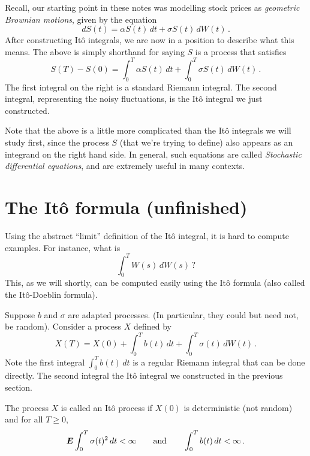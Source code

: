 Recall, our starting point in these notes was modelling stock prices as \emph{geometric Brownian motions}, given by the equation
\begin{equation*}
  dS(t) = \alpha S(t) \, dt + \sigma S(t) \, dW(t)\,.
\end{equation*}
After constructing It\^o integrals, we are now in a position to describe what this means.
The above is simply shorthand for saying $S$ is a process that satisfies
\begin{equation*}
  S(T) - S(0) = \int_0^T \alpha S(t) \, dt + \int_0^T \sigma S(t) \, dW(t)\,.
\end{equation*}
The first integral on the right is a standard Riemann integral.
The second integral, representing the noisy fluctuations, is the It\^o integral we just constructed.

Note that the above is a little more complicated than the It\^o integrals we will study first, since the process $S$ (that we're trying to define) also appears as an integrand on the right hand side.
In general, such equations are called \emph{Stochastic differential equations}, and are extremely useful in many contexts.

\section{The It\^o formula (unfinished)}

Using the abstract ``limit'' definition of the It\^o integral, it is hard to compute examples.
For instance, what is
\begin{equation*}
  \int_0^T W(s) \, dW(s) \,?
\end{equation*}
This, as we will shortly, can be computed easily using the It\^o formula (also called the It\^o-Doeblin formula).

Suppose $b$ and $\sigma$ are adapted processes.
(In particular, they could but need not, be random).
Consider a process $X$ defined by
\begin{equation}\label{e:3X}
  X(T) = X(0) + \int_0^T b(t) \, dt + \int_0^T \sigma(t) \, dW(t)\,.
\end{equation}
Note the first integral $\int_0^T b(t) \, dt$ is a regular Riemann integral that can be done directly.
The second integral the It\^o integral we constructed in the previous section.

\begin{definition}
  The process $X$ is called an It\^o process if $X(0)$ is deterministic (not random) and for all $T \geq 0$,
  \begin{equation*}
    \bm{E} \int_0^T \sigma(t)^2 \, dt < \infty
    \qquad\text{and}\qquad
    \int_0^T b(t) \, dt < \infty\,.
  \end{equation*}
\end{definition}


